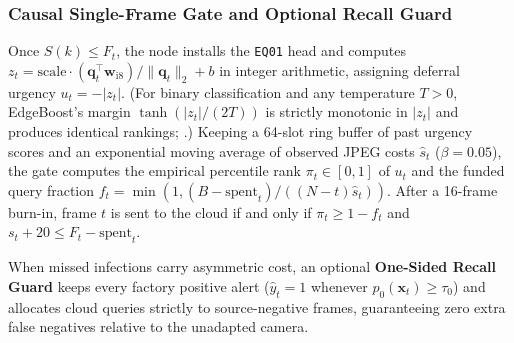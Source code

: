 \documentclass[preprint,12pt,authoryear]{elsarticle}
\begin{document}
\subsubsection{Causal Single-Frame Gate and Optional Recall Guard}
Once $S(k) \le F_t$, the node installs the \texttt{EQ01} head and computes $z_t = \mathrm{scale}\cdot (\mathbf{q}_t^\top \mathbf{w}_{\mathrm{i8}})/\|\mathbf{q}_t\|_2 + b$ in integer arithmetic, assigning deferral urgency $u_t = -|z_t|$. (For binary classification and any temperature $T > 0$, EdgeBoost's margin $\tanh(|z_t|/(2T))$ is strictly monotonic in $|z_t|$ and produces identical rankings; \citealp{edgeboost}.) Keeping a 64-slot ring buffer of past urgency scores and an exponential moving average of observed JPEG costs $\hat{s}_t$ ($\beta = 0.05$), the gate computes the empirical percentile rank $\pi_t \in [0,1]$ of $u_t$ and the funded query fraction $f_t = \min(1, (B - \mathrm{spent}_t)/((N-t)\hat{s}_t))$. After a 16-frame burn-in, frame $t$ is sent to the cloud if and only if $\pi_t \ge 1 - f_t$ and $s_t + 20 \le F_t - \mathrm{spent}_t$.

When missed infections carry asymmetric cost, an optional \textbf{One-Sided Recall Guard} keeps every factory positive alert ($\hat{y}_t = 1$ whenever $p_0(\mathbf{x}_t) \ge \tau_0$) and allocates cloud queries strictly to source-negative frames, guaranteeing zero extra false negatives relative to the unadapted camera.
\end{document}
